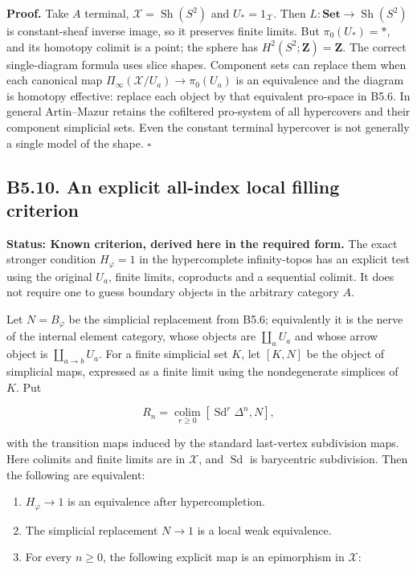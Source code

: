 \textbf{Proof.} Take \(A\) terminal,
\(\mathcal X=\operatorname{Sh}(S^2)\) and \(U_*=1_{\mathcal X}\). Then
\(L:\mathbf{Set}\to\operatorname{Sh}(S^2)\) is constant-sheaf inverse
image, so it preserves finite limits. But \(\pi_0(U_*)=*\), and its
homotopy colimit is a point; the sphere has
\(H^2(S^2;\mathbf Z)=\mathbf Z\). The correct single-diagram formula
uses slice shapes. Component sets can replace them when each canonical
map \(\Pi_\infty(\mathscr X/U_a)\to\pi_0(U_a)\) is an equivalence and
the diagram is homotopy effective: replace each object by that
equivalent pro-space in B5.6. In general Artin--Mazur retains the
cofiltered pro-system of all hypercovers and their component simplicial
sets. Even the constant terminal hypercover is not generally a single
model of the shape. \(\square\)

\subsection{B5.10. An explicit all-index local filling
criterion}\label{b5.10.-an-explicit-all-index-local-filling-criterion}

\textbf{Status: Known criterion, derived here in the required form.} The
exact stronger condition \(H_\varphi=1\) in the hypercomplete
infinity-topos has an explicit test using the original \(U_a\), finite
limits, coproducts and a sequential colimit. It does not require one to
guess boundary objects in the arbitrary category \(A\).

Let \(N=B_\varphi\) be the simplicial replacement from B5.6;
equivalently it is the nerve of the internal element category, whose
objects are \(\coprod_aU_a\) and whose arrow object is
\(\coprod_{a\to b}U_a\). For a finite simplicial set \(K\), let
\([K,N]\) be the object of simplicial maps, expressed as a finite limit
using the nondegenerate simplices of \(K\). Put

\[R_n=\operatorname*{colim}_{r\ge0}[\operatorname{Sd}^{r}\Delta^n,N],\]

with the transition maps induced by the standard last-vertex subdivision
maps. Here colimits and finite limits are in \(\mathcal X\), and
\(\operatorname{Sd}\) is barycentric subdivision. Then the following are
equivalent:

\begin{enumerate}
\def\labelenumi{\arabic{enumi}.}
\tightlist
\item
  \(H_\varphi\to1\) is an equivalence after hypercompletion.
\item
  The simplicial replacement \(N\to1\) is a local weak equivalence.
\item
  For every \(n\ge0\), the following explicit map is an epimorphism in
  \(\mathcal X\):
\end{enumerate}

